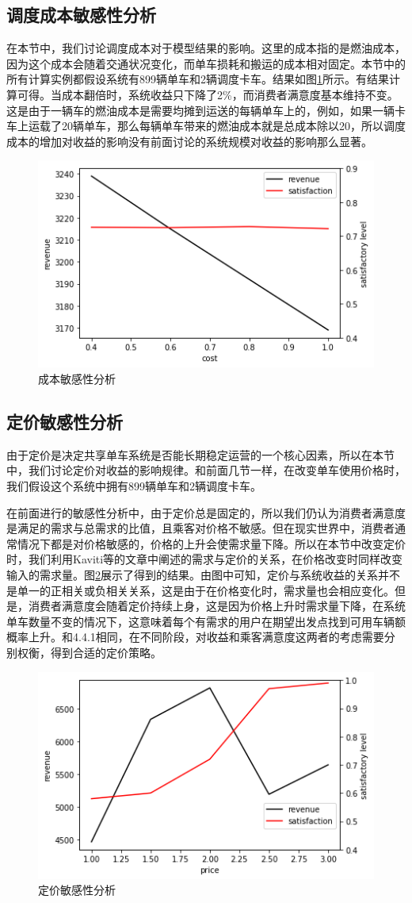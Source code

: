 \documentclass[]{tongjithesis}
\numberwithin{equation}{chapter}
\begin{document}
\subsection{调度成本敏感性分析}
在本节中，我们讨论调度成本对于模型结果的影响。这里的成本指的是燃油成本，因为这个成本会随着交通状况变化，而单车损耗和搬运的成本相对固定。本节中的所有计算实例都假设系统有899辆单车和2辆调度卡车。结果如图\ref{sens_cost}所示。有结果计算可得。当成本翻倍时，系统收益只下降了2\%，而消费者满意度基本维持不变。这是由于一辆车的燃油成本是需要均摊到运送的每辆单车上的，例如，如果一辆卡车上运载了20辆单车，那么每辆单车带来的燃油成本就是总成本除以20，所以调度成本的增加对收益的影响没有前面讨论的系统规模对收益的影响那么显著。
\begin{figure}[H]
    \centering
    \includegraphics[width=0.5 \textwidth]{figures_main/sensitivity_cost.png}
    \caption{成本敏感性分析}
    \label{sens_cost}
\end{figure}

\subsection{定价敏感性分析}
由于定价是决定共享单车系统是否能长期稳定运营的一个核心因素，所以在本节中，我们讨论定价对收益的影响规律。和前面几节一样，在改变单车使用价格时，我们假设这个系统中拥有899辆单车和2辆调度卡车。

在前面进行的敏感性分析中，由于定价总是固定的，所以我们仍认为消费者满意度是满足的需求与总需求的比值，且乘客对价格不敏感。但在现实世界中，消费者通常情况下都是对价格敏感的，价格的上升会使需求量下降。所以在本节中改变定价时，我们利用Kaviti等的文章中阐述的需求与定价的关系\cite{kaviti2019assessing}，在价格改变时同样改变输入的需求量。图\ref{sens_price}展示了得到的结果。由图中可知，定价与系统收益的关系并不是单一的正相关或负相关关系，这是由于在价格变化时，需求量也会相应变化。但是，消费者满意度会随着定价持续上身，这是因为价格上升时需求量下降，在系统单车数量不变的情况下，这意味着每个有需求的用户在期望出发点找到可用车辆额概率上升。和4.4.1相同，在不同阶段，对收益和乘客满意度这两者的考虑需要分别权衡，得到合适的定价策略。
\begin{figure}[H]
    \centering
    \includegraphics[width=0.5 \textwidth]{figures_main/sensitivity_price.png}
    \caption{定价敏感性分析}
    \label{sens_price}
\end{figure}
\end{document}
